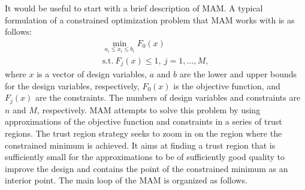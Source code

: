 \documentclass[runningheads,a4paper]{llncs}
\begin{document}
It would be useful to start with a brief description of MAM. A typical
formulation of a constrained optimization problem that MAM works with is as
follows:
\begin{equation}
  \label{eq:problem}
  \begin{array}{c}
  \min\limits_{a_i \le x_i \le b_i}F_0(x) \\
  \text{s.t.}\ F_j(x) \le 1,\ j=1,\dots ,M,
  \end{array}
\end{equation}
where $x$ is a vector of design variables, $a$ and $b$ are the lower and upper
bounds for the design variables, respectively, $F_0(x)$ is the objective
function, and $F_j(x)$ are the constraints. The numbers of design variables and
constraints are $n$ and $M$, respectively. MAM attempts to solve this problem
by using approximations of the objective function and constraints in a series
of trust regions. The trust region strategy seeks to zoom in on the region
where the constrained minimum is achieved. It aims at finding a trust region
that is sufficiently small for the approximations to be of sufficiently good
quality to improve the design and contains the point of the constrained minimum
as an interior point. The main loop of the MAM is organized as follows.
\end{document}
